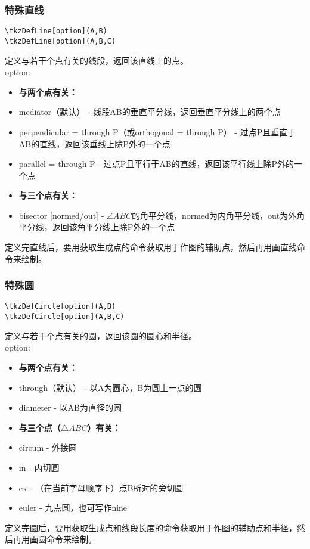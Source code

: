 \documentclass[UTF8]{ctexart}
\begin{document}
\subsubsection{特殊直线}
\begin{lstlisting}
\tkzDefLine[option](A,B)
\tkzDefLine[option](A,B,C)
\end{lstlisting}
定义与若干个点有关的线段，返回该直线上的点。\\
option:
\begin{itemize}
    \item \textbf{与两个点有关：}
    \item mediator（默认） - 线段AB的垂直平分线，返回垂直平分线上的两个点
    \item perpendicular = through P（或orthogonal = through P） - 过点P且垂直于AB的直线，返回该垂线上除P外的一个点
    \item parallel = through P - 过点P且平行于AB的直线，返回该平行线上除P外的一个点
    \item \textbf{与三个点有关：}
    \item bisector [normed/out] - $\angle ABC$的角平分线，normed为内角平分线，out为外角平分线，返回该角平分线上除P外的一个点
\end{itemize}
定义完直线后，要用获取生成点的命令获取用于作图的辅助点，然后再用画直线命令来绘制。
\subsubsection{特殊圆}
\begin{lstlisting}
\tkzDefCircle[option](A,B)
\tkzDefCircle[option](A,B,C)
\end{lstlisting}
定义与若干个点有关的圆，返回该圆的圆心和半径。\\
option:
\begin{itemize}
    \item \textbf{与两个点有关：}
    \item through（默认） - 以A为圆心，B为圆上一点的圆
    \item diameter - 以AB为直径的圆
    \item \textbf{与三个点（$\triangle ABC$）有关：}
    \item circum - 外接圆
    \item in - 内切圆
    \item ex - （在当前字母顺序下）点B所对的旁切圆
    \item euler - 九点圆，也可写作nine
\end{itemize}
定义完圆后，要用获取生成点和线段长度的命令获取用于作图的辅助点和半径，然后再用画圆命令来绘制。
\end{document}
